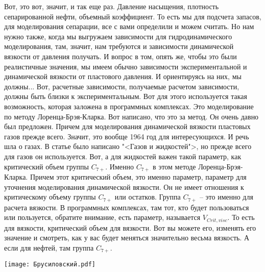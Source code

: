 \documentclass[main.tex]{subfiles}
\begin{document}
Вот, это вот, значит, и так еще раз.
Давление насыщения, плотность сепарированной нефти, объемный коэффициент.
То есть мы для подсчета запасов, для моделирования сепарации, все с вами определили и можем считать.
Но нам нужно также, когда мы выгружаем зависимости для гидродинамического моделирования, там, значит, нам требуются и зависимости динамической вязкости от давления получать.
И вопрос в том, опять же, чтобы это были реалистичные значения, мы имеем обычно зависимости экспериментальной и динамической вязкости от пластового давления.
И ориентируясь на них, мы должны...
Вот, расчетные зависимости, получаемые расчетом зависимости, должны быть близки к экспериментальным.
Вот для этого используется такая возможность, которая заложена в программных комплексах.
Это моделирование по методу Лоренца-Брэя-Кларка.
Вот написано, что это за метод.
Он очень давно был предложен.
Причем для моделирования динамической вязкости пластовых газов прежде всего.
Значит, это вообще 1964 год для интересующихся.
И речь шла о газах.
В статье было написано "<Газов и жидкостей">, но прежде всего для газов он используется.
Вот, а для жидкостей важен такой параметр, как критический объем группы $C_{7+}$.
Именно $C_{7+}$ в этом методе Лоренца-Брэя-Кларка.
Причем этот критический объем, это именно параметр, параметр для уточнения моделирования динамической вязкости.
Он не имеет отношения к критическому объему группы $C_{7+}$ или остатков.
Группа $C_{7+}$ -- это именно для расчета вязкости.
В программных комплексах, там тот, кто будет пользоваться или пользуется, обратите внимание, есть параметр, называется $V_{Crit,visc}$.
То есть для вязкости, критический объем для вязкости.
Вот вы можете его, изменять его значение и смотреть, как у вас будет меняться значительно весьма вязкость.
А если для нефтей, там группа $C_{7+}$.

\begin{center}
\texttt{[image: Брусиловский.pdf]}
\end{center}
\end{document}
